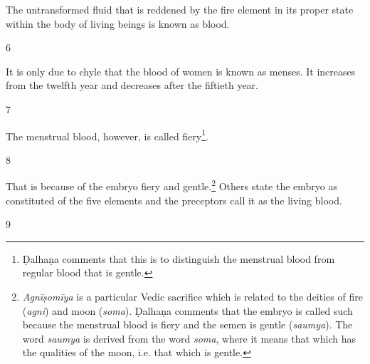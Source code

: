 \begin{translation}
The untransformed fluid that is reddened by the fire element in its proper state within the body of living beings is known as blood. %

\item [6]

It is only due to chyle that the blood of women is known as menses. It increases from the twelfth year and decreases after the fiftieth year. 


\item [7]

The menstrual blood, however, is called fiery\footnote{Ḍalhaṇa comments that this is to distinguish the menstrual blood from regular blood that is gentle.}.  

\item [8]

That is because of the embryo fiery and gentle.\footnote{\emph{Agnīṣomīya} is a particular Vedic sacrifice which is related to the deities of fire (\emph{agni}) and moon (\emph{soma}). Ḍalhaṇa comments that the embryo is called such because the menstrual blood is fiery and the semen is gentle (\emph{saumya}). The word \emph{saumya} is derived from the word \emph{soma}, where it means that which has the qualities of the moon, i.e. that which is gentle.}
Others state the embryo as constituted of the five elements and the preceptors call it as the living blood. 

\item [9]


\end{translation}

